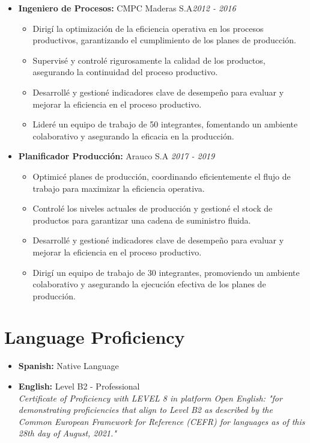 \documentclass[a4paper,10pt]{article}
\begin{document}
\begin{itemize}[left=0pt]
			\item \textbf{\large Ingeniero de Procesos:}  CMPC Maderas S.A\hfill \textit{2012 - 2016} 
			\begin{itemize}[left=10pt, topsep=0pt]
				\item Dirigí la optimización de la eficiencia operativa en los procesos productivos, garantizando el cumplimiento de los planes de producción.
				\item Supervisé y controlé rigurosamente la calidad de los productos, asegurando la continuidad del proceso productivo.
				\item Desarrollé y gestioné indicadores clave de desempeño para evaluar y mejorar la eficiencia en el proceso productivo.
				\item Lideré un equipo de trabajo de 50 integrantes, fomentando un ambiente colaborativo y asegurando la eficacia en la producción.
			\end{itemize}
		
			\item \textbf{\large Planificador Producción:} Arauco S.A \hfill \textit{2017 - 2019} 
			\begin{itemize}[left=10pt, topsep=0pt]
				  \item Optimicé planes de producción, coordinando eficientemente el flujo de trabajo para maximizar la eficiencia operativa.
				\item Controlé los niveles actuales de producción y gestioné el stock de productos para garantizar una cadena de suministro fluida.
				\item Desarrollé y gestioné indicadores clave de desempeño para evaluar y mejorar la eficiencia en el proceso productivo.
				\item Dirigí un equipo de trabajo de 30 integrantes, promoviendo un ambiente colaborativo y asegurando la ejecución efectiva de los planes de producción.
			\end{itemize}
		\end{itemize}

	
	\section*{Language Proficiency}
		\begin{itemize}
		\item \textbf{Spanish:} Native Language
		\item \textbf{English:} Level B2 - Professional\\
		\textit{Certificate of Proficiency with LEVEL 8 in platform Open English: "for demonstrating proficiencies that align to Level B2 as described by the Common European Framework for Reference (CEFR) for languages as of this 28th day of August, 2021."}
		
	\end{itemize}
	
	
\end{document}
